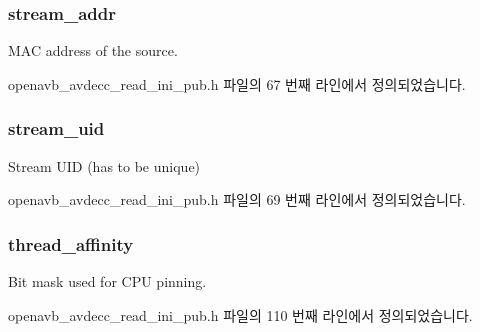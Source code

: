 \subsubsection[{\texorpdfstring{stream\+\_\+addr}{stream_addr}}]{ stream\+\_\+addr}\hypertarget{structopenavb__tl__data__cfg_aad445ea3a27a465a885b5d56648ad282}{}\label{structopenavb__tl__data__cfg_aad445ea3a27a465a885b5d56648ad282}


M\+AC address of the source. 



openavb\+\_\+avdecc\+\_\+read\+\_\+ini\+\_\+pub.\+h 파일의 67 번째 라인에서 정의되었습니다.

\subsubsection[{\texorpdfstring{stream\+\_\+uid}{stream_uid}}]{ stream\+\_\+uid}\hypertarget{structopenavb__tl__data__cfg_a511b2a26fe61b945ced1dd0bab9f2d1b}{}\label{structopenavb__tl__data__cfg_a511b2a26fe61b945ced1dd0bab9f2d1b}


Stream U\+ID (has to be unique) 



openavb\+\_\+avdecc\+\_\+read\+\_\+ini\+\_\+pub.\+h 파일의 69 번째 라인에서 정의되었습니다.

\subsubsection[{\texorpdfstring{thread\+\_\+affinity}{thread_affinity}}]{ thread\+\_\+affinity}\hypertarget{structopenavb__tl__data__cfg_a1e5d04c7780ba1521971899952932c78}{}\label{structopenavb__tl__data__cfg_a1e5d04c7780ba1521971899952932c78}


Bit mask used for C\+PU pinning. 



openavb\+\_\+avdecc\+\_\+read\+\_\+ini\+\_\+pub.\+h 파일의 110 번째 라인에서 정의되었습니다.


